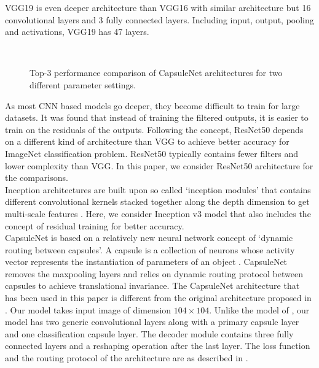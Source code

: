 \documentclass[10pt, journal, compsoc]{IEEEtran}
\begin{document}
VGG19 is even deeper architecture than VGG16 with similar architecture but 16 convolutional layers and 3 fully connected layers. Including input, output, pooling and activations, VGG19 has 47 layers.\\
\begin{figure*}
\captionsetup[subfigure]{labelformat=empty}
 \vspace{-3mm}\\
\caption{Top-3 performance comparison of CapsuleNet architectures for two different parameter settings.}
\label{fig:result_capsnet_comparisons}
\end{figure*}
As most CNN based models go deeper, they become difficult to train for large datasets. It was found that instead of training the filtered outputs, it is easier to train on the residuals of the outputs\cite{he2016deep}. Following the concept, ResNet50 depends on a different kind of architecture than VGG to achieve better accuracy for ImageNet classification problem. ResNet50 typically contains fewer filters and lower complexity than VGG. In this paper, we consider ResNet50 architecture for the comparisons.\\
Inception architectures are built upon so called `inception modules' that contains different convolutional kernels stacked together along the depth dimension to get multi-scale features \cite{szegedy2016rethinking}. Here, we consider Inception v3 model that also includes the concept of residual training for better accuracy.\\
CapsuleNet is based on a relatively new neural network concept of `dynamic routing between capsules'. A capsule is a collection of neurons whose activity vector represents the instantiation of parameters of an object \cite{sabour2017dynamic}. CapsuleNet removes the maxpooling layers and relies on dynamic routing protocol between capsules to achieve translational invariance. The CapsuleNet architecture that has been used in this paper is different from the original architecture proposed in \cite{sabour2017dynamic}. Our model takes input image of dimension $104\times104$. Unlike the model of \cite{sabour2017dynamic}, our model has two generic convolutional layers along with a primary capsule layer and one classification capsule layer. The decoder module contains three fully connected layers and a reshaping operation after the last layer. The loss function and the routing protocol of the architecture are as described in \cite{szegedy2016rethinking}.\\
\end{document}
